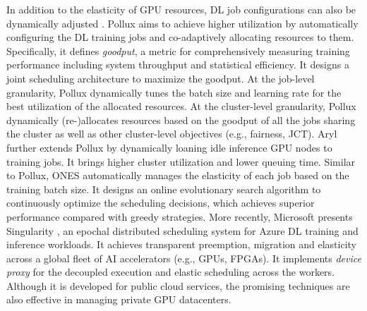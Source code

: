 In addition to the elasticity of GPU resources, DL job configurations can also be dynamically adjusted {\tiny{}}. Pollux \cite{Pollux} aims to achieve higher utilization by automatically configuring the DL training jobs and co-adaptively allocating resources to them. Specifically, it defines \emph{goodput}, a metric for comprehensively measuring training performance including system throughput and statistical efficiency. It designs a joint scheduling architecture to maximize the goodput. At the job-level granularity, Pollux dynamically tunes the batch size and learning rate for the best utilization of the allocated resources. At the cluster-level granularity, Pollux dynamically (re-)allocates resources based on the goodput of all the jobs sharing the cluster as well as other cluster-level objectives (e.g., fairness, JCT). Aryl \cite{Aryl} further extends Pollux by dynamically loaning idle inference GPU nodes to training jobs. It brings higher cluster utilization and lower queuing time. Similar to Pollux, ONES \cite{ONES} automatically manages the elasticity of each job based on the training batch size. It designs an online evolutionary search algorithm to continuously optimize the scheduling decisions, which achieves superior performance compared with greedy strategies. More recently, Microsoft presents Singularity \cite{Singularity}, an epochal distributed scheduling system for Azure DL training and inference workloads. It achieves transparent preemption, migration and elasticity across a global fleet of AI accelerators (e.g., GPUs, FPGAs). It implements \emph{device proxy} for the decoupled execution and elastic scheduling across the workers. Although it is developed for public cloud services, the promising techniques are also effective in managing private GPU datacenters.






































